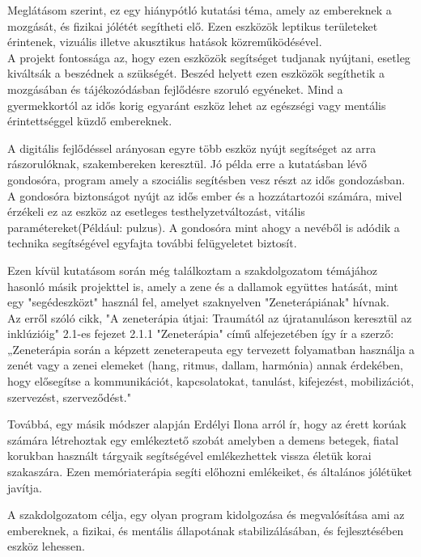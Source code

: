 \documentclass[tocnopagenum]{thesis-ekf}
\theoremstyle{definition}
\theoremstyle{remark}
\begin{document}
	Meglátásom szerint, ez egy hiánypótló kutatási téma, amely az embereknek a mozgását, és fizikai jólétét segítheti elő.
	Ezen eszközök leptikus területeket érintenek, vizuális illetve akusztikus hatások közreműködésével.
	\\
	A projekt fontossága az, hogy ezen eszközök segítséget tudjanak nyújtani, esetleg kiváltsák a beszédnek a szükségét. Beszéd helyett ezen eszközök segíthetik a mozgásában és tájékozódásban fejlődésre szoruló egyéneket. Mind a gyermekkortól az idős korig egyaránt eszköz lehet az egészségi vagy mentális érintettséggel küzdő embereknek.
	\par
	A digitális fejlődéssel arányosan egyre több eszköz nyújt segítséget az arra rászorulóknak, szakembereken keresztül. Jó példa erre a kutatásban lévő gondosóra, program amely a szociális segítésben vesz részt az idős gondozásban. A gondosóra biztonságot nyújt az idős ember és a hozzátartozói számára, mivel érzékeli ez az eszköz az esetleges testhelyzetváltozást, vitális paramétereket(Például: pulzus). A gondosóra mint ahogy a nevéből is adódik a technika segítségével egyfajta további felügyeletet biztosít.\cite{MTI}
	\par
	Ezen kívül kutatásom során még találkoztam a szakdolgozatom témájához hasonló másik projekttel is, amely a zene és a dallamok együttes hatását, mint egy "segédeszközt" használ fel, amelyet szaknyelven "Zeneterápiának" hívnak.\cite{zsofia2021zeneterapia}
	\\
	Az erről szóló cikk, "A zeneterápia útjai: Traumától az újratanuláson keresztül az inklúzióig" 2.1-es fejezet 2.1.1 "Zeneterápia" című alfejezetében így ír a szerző:
	„Zeneterápia során a képzett zeneterapeuta egy tervezett folyamatban használja a zenét vagy a zenei elemeket (hang, ritmus, dallam, harmónia) annak érdekében, hogy elősegítse a kommunikációt, kapcsolatokat, tanulást, kifejezést, mobilizációt, szervezést, szerveződést."
	\par
	Továbbá, egy másik módszer alapján Erdélyi Ilona arról ír, hogy az érett korúak számára létrehoztak egy emlékeztető szobát amelyben a demens betegek, fiatal korukban használt tárgyaik segítségével emlékezhettek vissza életük korai szakaszára. Ezen memóriaterápia segíti előhozni emlékeiket, és általános jólétüket javítja.\cite{erdelyiilonademensbetegek}
	
	A szakdolgozatom célja, egy olyan program kidolgozása és megvalósítása ami az embereknek, a fizikai, és mentális állapotának stabilizálásában, és fejlesztésében eszköz lehessen.
	\par 
	
\end{document}
